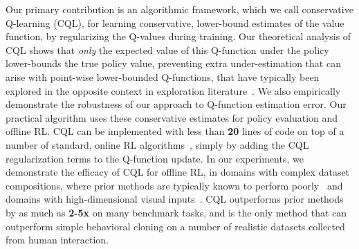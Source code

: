 Our primary contribution is an algorithmic framework, which we call conservative Q-learning (CQL), for learning conservative, lower-bound estimates of the value function, by regularizing the Q-values during training.
Our theoretical analysis of CQL shows that \textit{only} the expected value of this Q-function under the policy lower-bounds the true policy value, preventing extra under-estimation that can arise with point-wise lower-bounded Q-functions, that have typically been explored in the opposite context in exploration literature~\citep{osband2017posterior,jaksch2010near}.
We also empirically demonstrate the robustness of our approach to Q-function estimation error.
Our practical algorithm uses these conservative estimates for policy evaluation and offline RL. CQL can be implemented with less than \textbf{20} lines of code on top of a number of standard, online RL algorithms~\citep{haarnoja,dabney2018distributional}, simply by adding the CQL regularization terms to the Q-function update. In our experiments, we demonstrate the efficacy of CQL for offline RL, in domains with complex dataset compositions, where prior methods are typically known to perform poorly~\citep{d4rl} and domains with high-dimensional visual inputs~\citep{bellemare2013arcade,agarwal2019optimistic}. CQL outperforms prior methods by as much as \textbf{2-5x} on many benchmark tasks, and is the only method that can outperform simple behavioral cloning on a number of realistic datasets collected from human interaction.
